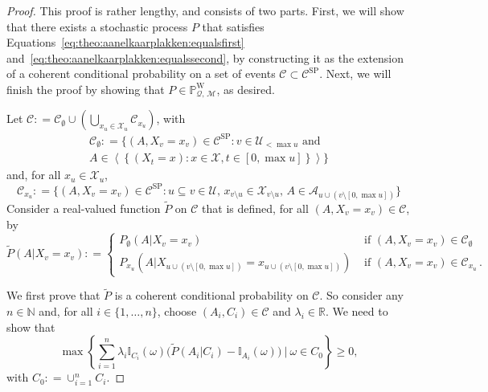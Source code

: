 \documentclass[10pt,a4paper]{paper}
\theoremstyle{definition}
\newcommand{\nats}{\mathbb{N}}
\newcommand{\reals}{\mathbb{R}}
\newcommand{\states}{\mathcal{X}}
\newcommand{\processes}{\mathbb{P}}
\newcommand{\wprocesses}{\processes^{\mathrm{W}}}
\newcommand{\ind}[1]{\mathbb{I}_{#1}}
\newcommand{\rateset}{\mathcal{Q}}
\newcommand{\coloneqq}{:\!=}
\begin{document}
\theoaanelkaarplakken*
\begin{proof}
This proof is rather lengthy, and consists of two parts. First, we will show that there exists a stochastic process $P$ that satisfies Equations~\eqref{eq:theo:aanelkaarplakken:equalsfirst} and~\eqref{eq:theo:aanelkaarplakken:equalssecond}, by constructing it as the extension of a coherent conditional probability on a set of events $\mathcal{C}\subset\mathcal{C}^\mathrm{SP}$. Next, we will finish the proof by showing that $P\in\wprocesses_{\rateset,\,\mathcal{M}}$, as desired.

Let $\mathcal{C}\coloneqq\mathcal{C}_\emptyset\cup(\bigcup_{x_u\in\states_u}\mathcal{C}_{x_u})$, with
\begin{multline}\label{eq:theo:aanelkaarplakken:firstpartofdomain}
\mathcal{C}_\emptyset\coloneqq
\{(A,X_v=x_v)\in\mathcal{C}^{\mathrm{SP}}\colon v\in\mathcal{U}_{< \max u}\text{~and~}\\A\in\left\langle
\left\{
(X_t=x)
\colon
x\in\states,t\in[0,\max u]
\right\}
\right\rangle\}
\end{multline}
and, for all $x_u\in\states_u$,
\begin{equation}\label{eq:theo:aanelkaarplakken:secondpartofdomain}
\mathcal{C}_{x_u}\coloneqq\{
(A,X_v=x_v)\in\mathcal{C}^\mathrm{SP}
\colon
u\subseteq v\in\mathcal{U},\,
x_{v\setminus u}\in\states_{v\setminus u},\,
 A\in\mathcal{A}_{u\cup(v\setminus[0,\max u])}
\}
\end{equation}
Consider a real-valued function $\tilde{P}$ on $\mathcal{C}$ that is defined, for all $(A,X_v=x_v)\in\mathcal{C}$, by
\begin{equation}\label{eq:theo:aanelkaarplakken:defPtilde}
\tilde{P}(A\vert X_v=x_v)
\coloneqq
\begin{cases}
P_\emptyset(A\vert X_v=x_v)&\text{~if $(A,X_v=x_v)\in\mathcal{C}_\emptyset$}\\
P_{x_u}(A\vert 
X_{u\cup(v\setminus[0,\max u])}=x_{u\cup(v\setminus[0,\max u])})&\text{~if $(A,X_v=x_v)\in\mathcal{C}_{x_u}$}\,.
\end{cases}
\end{equation}


We first prove that $\tilde{P}$ is a coherent conditional probability on $\mathcal{C}$. So consider any $n\in\nats$ and, for all $i\in\{1,\dots,n\}$, choose $(A_i,C_i)\in\mathcal{C}$ and $\lambda_i\in\reals$. We need to show that
\begin{equation}\label{eq:theo:aanelkaarplakken:coh}
\max\left\{\sum_{i=1}^n\lambda_i\ind{C_i}(\omega)\bigl(\tilde{P}(A_i\vert C_i)-\ind{A_i}(\omega)\bigr)~\Bigg\vert~\omega\in C_0\right\}\geq0,
\end{equation}
with $C_0\coloneqq\cup_{i=1}^nC_i$.


\end{proof}
\end{document}
